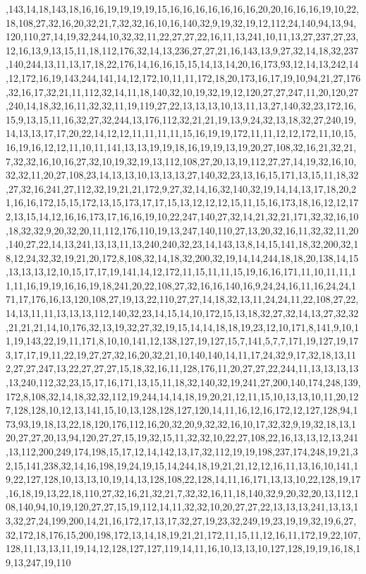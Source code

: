 ,143,14,18,143,18,16,16,19,19,19,19,15,16,16,16,16,16,16,16,20,20,16,16,16,19,10,22,18,108,27,32,16,20,32,21,7,32,32,16,10,16,140,32,9,19,32,19,12,112,24,140,94,13,94,120,110,27,14,19,32,244,10,32,32,11,22,27,27,22,16,11,13,241,10,11,13,27,237,27,23,12,16,13,9,13,15,11,18,112,176,32,14,13,236,27,27,21,16,143,13,9,27,32,14,18,32,237,140,244,13,11,13,17,18,22,176,14,16,16,15,15,14,13,14,20,16,173,93,12,14,13,242,14,12,172,16,19,143,244,141,14,12,172,10,11,11,172,18,20,173,16,17,19,10,94,21,27,176,32,16,17,32,21,11,112,32,14,11,18,140,32,10,19,32,19,12,120,27,27,247,11,20,120,27,240,14,18,32,16,11,32,32,11,19,119,27,22,13,13,13,10,13,11,13,27,140,32,23,172,16,15,9,13,15,11,16,32,27,32,244,13,176,112,32,21,21,19,13,9,24,32,13,18,32,27,240,19,14,13,13,17,17,20,22,14,12,12,11,11,11,11,15,16,19,19,172,11,11,12,12,172,11,10,15,16,19,16,12,12,11,10,11,141,13,13,19,19,18,16,19,19,13,19,20,27,108,32,16,21,32,21,7,32,32,16,10,16,27,32,10,19,32,19,13,112,108,27,20,13,19,112,27,27,14,19,32,16,10,32,32,11,20,27,108,23,14,13,13,10,13,13,13,27,140,32,23,13,16,15,171,13,15,11,18,32,27,32,16,241,27,112,32,19,21,21,172,9,27,32,14,16,32,140,32,19,14,14,13,17,18,20,21,16,16,172,15,15,172,13,15,173,17,17,15,13,12,12,12,15,11,15,16,173,18,16,12,12,172,13,15,14,12,16,16,173,17,16,16,19,10,22,247,140,27,32,14,21,32,21,171,32,32,16,10,18,32,32,9,20,32,20,11,112,176,110,19,13,247,140,110,27,13,20,32,16,11,32,32,11,20,140,27,22,14,13,241,13,13,11,13,240,240,32,23,14,143,13,8,14,15,141,18,32,200,32,18,12,24,32,32,19,21,20,172,8,108,32,14,18,32,200,32,19,14,14,244,18,18,20,138,14,15,13,13,13,12,10,15,17,17,19,141,14,12,172,11,15,11,11,15,19,16,16,171,11,10,11,11,11,11,16,19,19,16,16,19,18,241,20,22,108,27,32,16,16,140,16,9,24,24,16,11,16,24,24,171,17,176,16,13,120,108,27,19,13,22,110,27,27,14,18,32,13,11,24,24,11,22,108,27,22,14,13,11,11,13,13,13,112,140,32,23,14,15,14,10,172,15,13,18,32,27,32,14,13,27,32,32,21,21,21,14,10,176,32,13,19,32,27,32,19,15,14,14,18,18,19,23,12,10,171,8,141,9,10,11,19,143,22,19,11,171,8,10,10,141,12,138,127,19,127,15,7,141,5,7,7,171,19,127,19,173,17,17,19,11,22,19,27,27,32,16,20,32,21,10,140,140,14,11,17,24,32,9,17,32,18,13,112,27,27,247,13,22,27,27,27,15,18,32,16,11,128,176,11,20,27,27,22,244,11,13,13,13,13,13,240,112,32,23,15,17,16,171,13,15,11,18,32,140,32,19,241,27,200,140,174,248,139,172,8,108,32,14,18,32,32,112,19,244,14,14,18,19,20,21,12,11,15,10,13,13,10,11,20,127,128,128,10,12,13,141,15,10,13,128,128,127,120,14,11,16,12,16,172,12,127,128,94,173,93,19,18,13,22,18,120,176,112,16,20,32,20,9,32,32,16,10,17,32,32,9,19,32,18,13,120,27,27,20,13,94,120,27,27,15,19,32,15,11,32,32,10,22,27,108,22,16,13,13,12,13,241,13,112,200,249,174,198,15,17,12,14,142,13,17,32,112,19,19,198,237,174,248,19,21,32,15,141,238,32,14,16,198,19,24,19,15,14,244,18,19,21,21,12,12,16,11,13,16,10,141,19,22,127,128,10,13,13,10,19,14,13,128,108,22,128,14,11,16,171,13,13,10,22,128,19,17,16,18,19,13,22,18,110,27,32,16,21,32,21,7,32,32,16,11,18,140,32,9,20,32,20,13,112,108,140,94,10,19,120,27,27,15,19,112,14,11,32,32,10,20,27,27,22,13,13,13,241,13,13,13,32,27,24,199,200,14,21,16,172,17,13,17,32,27,19,23,32,249,19,23,19,19,32,19,6,27,32,172,18,176,15,200,198,172,13,14,18,19,21,21,172,11,15,11,12,16,11,172,19,22,107,128,11,13,13,11,19,14,12,128,127,127,119,14,11,16,10,13,13,10,127,128,19,19,16,18,19,13,247,19,110